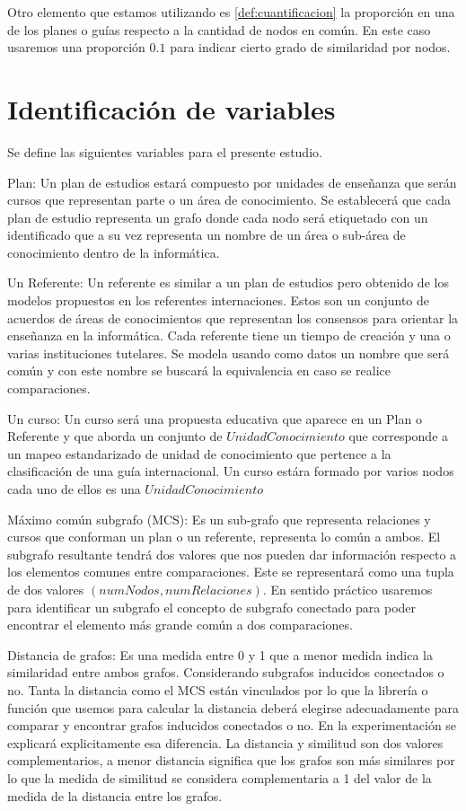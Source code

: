 	Otro elemento que estamos utilizando es \ref{def:cuantificacion} la proporción en una de los planes o guías respecto a la cantidad de nodos en común. En este caso usaremos una proporción $0.1$ para indicar cierto grado de similaridad por nodos. 

\section{Identificación de variables}

Se define las siguientes variables para el presente estudio. 

Plan: Un plan de estudios estará compuesto por unidades de enseñanza que serán cursos que representan parte o un área de conocimiento. Se establecerá que cada plan de estudio representa un grafo donde cada nodo será etiquetado con un identificado que a su vez representa un nombre de un área o sub-área de conocimiento dentro de la informática. 

Un Referente: Un referente es similar a un plan de estudios pero obtenido de los modelos propuestos en los referentes internaciones. Estos son un conjunto de acuerdos de áreas de conocimientos que representan los consensos para orientar la enseñanza en la informática. Cada referente tiene un tiempo de creación y una o varias instituciones tutelares. Se modela usando como datos un nombre que será común y con este nombre se buscará la equivalencia en caso se realice comparaciones.

Un curso: Un curso será una propuesta educativa que aparece en un Plan o Referente y que aborda un conjunto de $UnidadConocimiento$ que corresponde a un mapeo estandarizado de unidad de conocimiento que pertence a la clasificación de una guía internacional. Un curso estára formado por varios nodos cada uno de ellos es una $UnidadConocimiento$

Máximo común subgrafo (MCS): Es un sub-grafo que representa relaciones y cursos que conforman un plan o un referente, representa lo común a ambos. El subgrafo resultante tendrá dos valores que nos pueden dar información respecto a los elementos comunes entre comparaciones. Este se representará como una tupla de dos valores $(numNodos, numRelaciones)$. En sentido práctico usaremos para identificar un subgrafo el concepto de subgrafo conectado para poder encontrar el elemento más grande común a dos comparaciones.

Distancia de grafos: Es una medida entre 0 y 1 que a menor medida indica la similaridad entre ambos grafos. Considerando subgrafos inducidos conectados o no. Tanta la distancia como el MCS están vinculados por lo que la librería o función que usemos para calcular la distancia deberá elegirse adecuadamente para comparar y encontrar grafos inducidos conectados o no. En la experimentación se explicará explicitamente esa diferencia. La distancia y similitud son dos valores complementarios, a menor distancia significa que los grafos son más similares por lo que la medida de similitud se considera complementaria a 1 del valor de la medida de la distancia entre los grafos.


